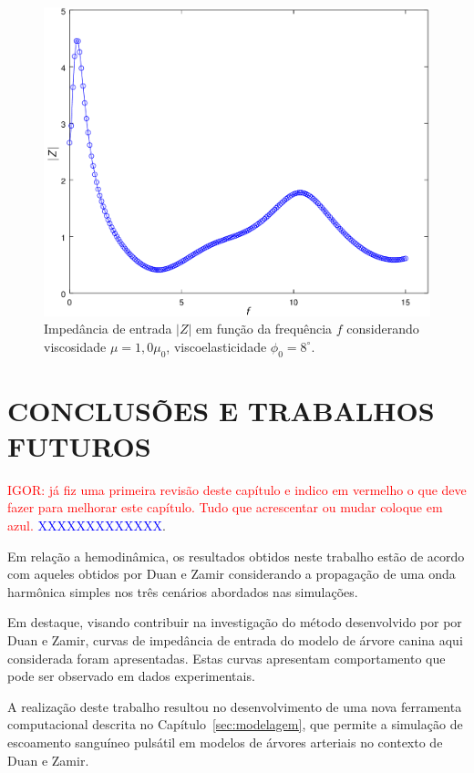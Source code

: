 \documentclass[a4paper,12pt]{monografia}
\theoremstyle{plain}
\theoremstyle{definition}
\theoremstyle{remark}
\begin{document}
\begin{figure}[!htbp]
	\centering
	\includegraphics[scale=0.7]{figure-result-impedance/fig_viscosidade1_viscoelasticity8_impedance_new.png}
	\caption{Impedância de entrada $|Z|$ em função da frequência $f$ considerando viscosidade $\mu = 1,0 \mu_0$, viscoelasticidade $\phi_0 = 8^{\circ}$.}
	\label{fig5b:arterial-tree}%
\end{figure}

\chapter{CONCLUSÕES E TRABALHOS FUTUROS}
\textcolor{red}{IGOR: já fiz uma primeira revisão deste capítulo e indico em vermelho o que deve fazer para melhorar este capítulo. Tudo que acrescentar ou mudar coloque em azul.}
\textcolor{blue}{XXXXXXXXXXXXX}.

Em relação a hemodinâmica, os resultados obtidos neste trabalho estão de acordo com aqueles obtidos por Duan e Zamir\textcolor{blue}{ \cite{Duan1992} } considerando a propagação de uma onda harmônica simples nos três cenários abordados nas simulações. 

Em destaque, visando contribuir na investigação do método desenvolvido por por Duan e Zamir, curvas de impedância de entrada do modelo de árvore canina aqui considerada foram apresentadas. Estas curvas apresentam comportamento que pode ser observado em dados experimentais.

A realização deste trabalho resultou no desenvolvimento de uma nova ferramenta computacional descrita no Capítulo~\ref{sec:modelagem}, que permite a simulação de escoamento sanguíneo pulsátil em modelos de árvores arteriais no contexto de Duan e Zamir. 
\end{document}
